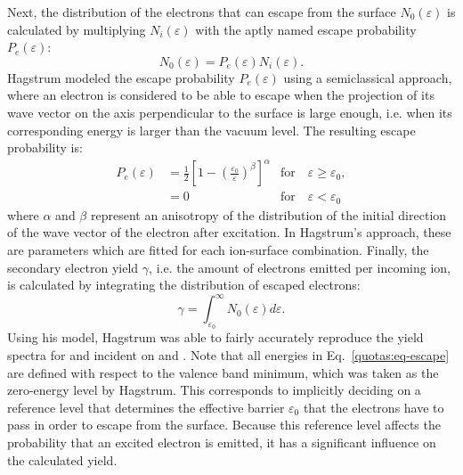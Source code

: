 \begin{refsection}
Next, the distribution of the electrons that can escape from the surface 
$N_0(\varepsilon)$ is calculated by multiplying $N_i(\varepsilon)$ with the 
aptly named escape probability $P_e(\varepsilon)$: 
\begin{equation} 
N_0(\varepsilon) = P_e (\varepsilon) N_i (\varepsilon). 
\end{equation} 
Hagstrum modeled the escape probability $P_e(\varepsilon)$ using a 
semiclassical approach, where an electron is considered to be able to escape 
when the projection of its wave vector on the axis perpendicular to the 
surface is large enough, i.e. when its corresponding energy is larger than the 
vacuum level. The resulting escape probability is: 
\begin{equation} \label{quotas:eq-escape} 
\begin{aligned} 
P_e(\varepsilon) &= \frac{1}{2}\left[1 - 
\left(\frac{\varepsilon_0}{\varepsilon}\right)^\beta\right]^\alpha & 
\text{for} \hspace{1em}\varepsilon \geq \varepsilon_0, \\ 
&= 0 &\text{for} \hspace{1em}\varepsilon < \varepsilon_0 
\end{aligned} 
\end{equation} 
where $\alpha$ and $\beta$ represent an anisotropy of the distribution of the 
initial direction of the wave vector of the electron after excitation. In 
Hagstrum's approach, these are parameters which are fitted for each 
ion-surface combination.  Finally, the secondary electron yield $\gamma$, i.e. 
the amount of electrons emitted per incoming ion, is calculated by integrating 
the distribution of escaped electrons: 
\begin{equation} \label{quotas:eq-yield} 
\gamma = \int_{\varepsilon_0}^\infty N_0(\varepsilon) d\varepsilon. 
\end{equation} 
Using his model, Hagstrum was able to fairly accurately reproduce the yield 
spectra for  and  incident on  and . 
Note that all energies in Eq.~\ref{quotas:eq-escape} are defined with respect 
to the valence band minimum, which was taken as the zero-energy level by 
Hagstrum. This corresponds to implicitly deciding on a reference level that 
determines the effective barrier $\varepsilon_0$ that the electrons have to 
pass in order to escape from the surface. Because this reference level affects 
the probability that an excited electron is emitted, it has a significant 
influence on the calculated yield.\\ 
 

\end{refsection}
